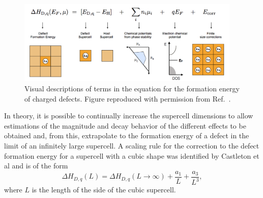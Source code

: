 \documentclass[11pt, twoside]{report}
\begin{document}
\begin{figure}[h!]
  \centering
    \includegraphics[width=0.95\textwidth]{figures/pylada_eq.png}
    \caption[Visual descriptions of terms in the equation for the formation energy of charged defects.]{Visual descriptions of terms in the equation for the formation energy of charged defects. Figure reproduced with permission from Ref.~.}
  \label{pylada_eq}
\end{figure}

In theory, it is possible to continually increase the supercell dimensions to allow estimations of the magnitude and decay behavior of the different effects to be obtained and, from this, extrapolate to the formation energy of a defect in the limit of an infinitely large supercell. A scaling rule for the correction to the defect formation energy for a supercell with a cubic shape was identified by Castleton et al \cite{supercell_scaling} and is of the form 
\begin{equation}\label{defect_scaling_rule}
\Delta H_{D,q}(L) = \Delta H_{D,q}(L \rightarrow \infty) + \frac{a_1}{L} + \frac{a_3}{L^3},
\end{equation}
where $L$ is the length of the side of the cubic supercell.
\end{document}
